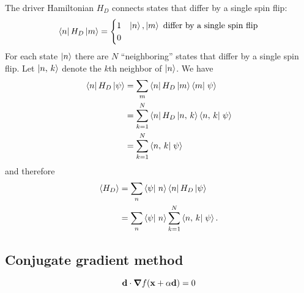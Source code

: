 The driver Hamiltonian $H_D$ connects states that differ by a single spin flip:
\begin{equation}
  \matrixel{n}{H_D}{m}
  = \begin{cases}
    1 & \ket{n}, \ket{m} \text{ differ by a single spin flip} \\
    0
  \end{cases}
  \label{}
\end{equation}
For each state $\left| n \right>$ there are $N$ ``neighboring'' states that differ by a
single spin flip. Let $\left| n,\,k \right>$ denote the $k$th neighbor of
$\left| n \right>$. We have
\begin{align}
  \matrixel{n}{H_D}{\psi}
  &= \sum_m \matrixel{n}{H_D}{m} \braket{m}{\psi} \\
  &= \sum_{k=1}^N \matrixel{n}{H_D}{\nghbr{n}{k}} \braket{\nghbr{n}{k}}{\psi} \\
  &= \sum_{k=1}^N \braket{\nghbr{n}{k}}{\psi}
  \label{eq:id}
\end{align}
and therefore
\begin{align}
  \avg{H_D}
  &= \sum_n \braket{\psi}{n} \matrixel{n}{H_D}{\psi} \\
  &= \sum_n \braket{\psi}{n} \sum_{k=1}^{N} \braket{\nghbr{n}{k}}{\psi}.
  \label{}
\end{align}

\subsection{Conjugate gradient method}

\begin{equation}
  \mathbf{d} \cdot \mbox{\boldmath$ \nabla $} f(\mathbf{x} + \alpha \mathbf{d}) = 0
  \label{}
\end{equation}



